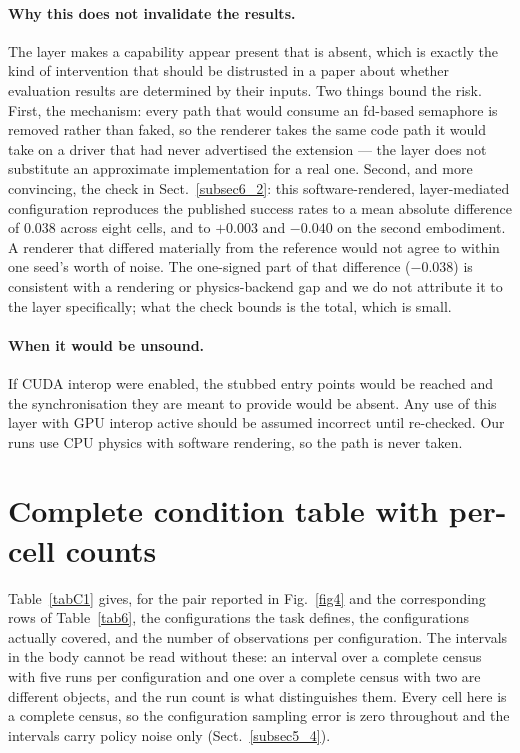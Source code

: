 \documentclass[pdflatex,iicol,sn-apa]{sn-jnl}
\theoremstyle{remark}
\begin{document}
\begin{appendices}
\paragraph{Why this does not invalidate the results.}
The layer makes a capability appear present that is absent, which is exactly the kind of
intervention that should be distrusted in a paper about whether evaluation results are determined by
their inputs. Two things bound the risk. First, the mechanism: every path that would consume an
fd-based semaphore is removed rather than faked, so the renderer takes the same code path it would
take on a driver that had never advertised the extension --- the layer does not substitute an
approximate implementation for a real one. Second, and more convincing, the check in
Sect.~\ref{subsec6_2}: this software-rendered, layer-mediated configuration reproduces the
published success rates to a mean absolute difference of 0.038 across eight cells, and to $+0.003$
and $-0.040$ on the second embodiment. A renderer that differed materially from the reference would
not agree to within one seed's worth of noise. The one-signed part of that difference ($-0.038$) is
consistent with a rendering or physics-backend gap and we do not attribute it to the layer
specifically; what the check bounds is the total, which is small.

\paragraph{When it would be unsound.}
If CUDA interop were enabled, the stubbed entry points would be reached and the synchronisation they
are meant to provide would be absent. Any use of this layer with GPU interop active should be
assumed incorrect until re-checked. Our runs use CPU physics with software rendering, so the path is
never taken.

\section{Complete condition table with per-cell counts}\label{secC}

Table~\ref{tabC1} gives, for the pair reported in Fig.~\ref{fig4} and the corresponding rows of
Table~\ref{tab6}, the configurations the task defines, the configurations actually covered, and the
number of observations per configuration. The intervals in the body cannot be read without these: an
interval over a complete census with five runs per configuration and one over a complete census with
two are different objects, and the run count is what distinguishes them. Every cell here is a
complete census, so the configuration sampling error is zero throughout and the intervals carry
policy noise only (Sect.~\ref{subsec5_4}).


\end{appendices}
\end{document}
